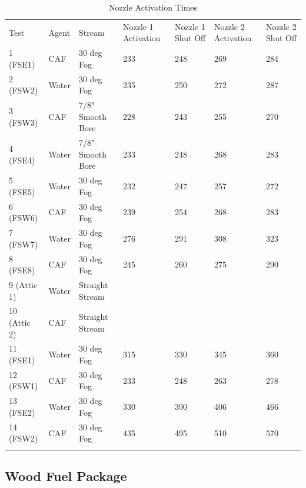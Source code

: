 \documentclass[12pt,oneside]{book}
\begin{document}
\begin{table}
	\centering
	\caption{Nozzle Activation Times}
	\begin{tabular}{lllllll}
		\hline\noalign{\smallskip}
		Test		& Agent		& Stream				& Nozzle 1 Activation	& Nozzle 1 Shut Off		& Nozzle 2 Activation	& Nozzle 2 Shut Off \\
		\noalign{\smallskip}\hline\noalign{\smallskip}
		1 (FSE1)    &  CAF      &  30 deg Fog  	    	& 233 					& 248					& 269					& 284					\\
		2 (FSW2)   	& Water     &  30 deg Fog  	    	& 235					& 250					& 272					& 287					\\
		3 (FSW3) 	&  CAF      &  7/8" Smooth Bore     & 228					& 243 					& 255					& 270					\\
		4 (FSE4)    &  Water    &  7/8" Smooth Bore     & 233					& 248					& 268					& 283					\\
		5 (FSE5)    &  Water    &  30 deg Fog  	    	& 232					& 247					& 257					& 272					\\
		6 (FSW6)    &  CAF      &  30 deg Fog     		& 239					& 254					& 268					& 283					\\
		7 (FSW7)    &  Water    &  30 deg Fog     		& 276					& 291					& 308					& 323					\\
		8 (FSE8)    &  CAF      &  30 deg Fog     		& 245					& 260					& 275					& 290					\\
		9 (Attic 1) &  Water    &  Straight Stream     	&						&						&						&					\\
		10 (Attic 2)&  CAF      &  Straight Stream     	& 						&						&						&					\\
		11 (FSE1)   &  Water    &  30 deg Fog  	   		& 315					& 330					& 345					& 360					\\
		12 (FSW1)   &  CAF      &  30 deg Fog  	   		& 233					& 248					& 263					& 278					\\
		13 (FSE2)   &  Water    &  30 deg Fog  	   		& 330					& 390					& 406					& 466					\\
		14 (FSW2)   &  CAF      &  30 deg Fog  	  		& 435					& 495					& 510					& 570					\\
		\noalign{\smallskip}\hline
	\end{tabular}
	\label{tab:Nozzle_Activation_Times}
\end{table}

\subsection{Wood Fuel Package}
\label{subsec:Wood_Fuel_Package}
\end{document}
